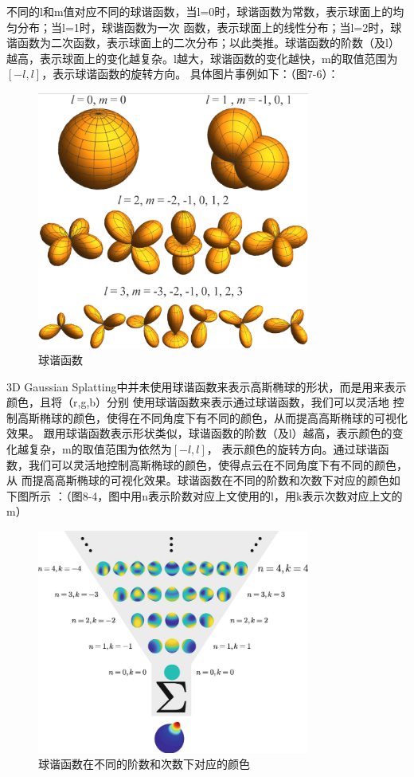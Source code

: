 \documentclass{nwputhesis}
\begin{document}
\indent
不同的l和m值对应不同的球谐函数，当l=0时，球谐函数为常数，表示球面上的均匀分布；当l=1时，球谐函数为一次
函数，表示球面上的线性分布；当l=2时，球谐函数为二次函数，表示球面上的二次分布；以此类推。球谐函数的阶数（及l）
越高，表示球面上的变化越复杂。l越大，球谐函数的变化越快，m的取值范围为$[-l,l]$，表示球谐函数的旋转方向。
具体图片事例如下：（图7-6）：
\begin{figure}[H]
    \centering
    \includegraphics[width=0.8\textwidth]{picture/27.png}
    \caption{球谐函数}
\end{figure}

3D Gaussian Splatting中并未使用球谐函数来表示高斯椭球的形状，而是用来表示颜色，且将（r,g,b）分别
使用球谐函数来表示通过球谐函数，我们可以灵活地
控制高斯椭球的颜色，使得在不同角度下有不同的颜色，从而提高高斯椭球的可视化效果。
跟用球谐函数表示形状类似，球谐函数的阶数（及l）越高，表示颜色的变化越复杂，m的取值范围为依然为$[-l,l]$，
表示颜色的旋转方向。通过球谐函数，我们可以灵活地控制高斯椭球的颜色，使得点云在不同角度下有不同的颜色，从
而提高高斯椭球的可视化效果。球谐函数在不同的阶数和次数下对应的颜色如下图所示
：（图8-4，图中用n表示阶数对应上文使用的l，用k表示次数对应上文的m）
\begin{figure}[H]
    \centering
    \includegraphics[width=0.8\textwidth]{picture/28.png}
    \caption{球谐函数在不同的阶数和次数下对应的颜色}
\end{figure}
\end{document}
